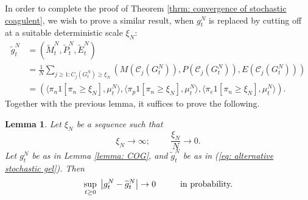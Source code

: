 \documentclass[11pt, notitlepage]{article}
\newtheorem{lem}[thm]{Lemma}
\begin{document}
  In order to complete the proof of Theorem \ref{thrm: convergence of stochastic coagulent}, we wish to prove a similar result, when $g^N_t$ is replaced by cutting off at a suitable deterministic scale $\xi_N$: \begin{equation}\label{eq: alternative stochastic gel} \begin{split} \widetilde{g}^N_t&=(\widetilde{M}^N_t,\widetilde{P}^N_t,\widetilde{E}^N_t)\\& =\frac{1}{N}\sum_{j\ge 1: C_j(G^N_t)\ge \xi_N}(M(\mathcal{C}_j(G^N_t)),P(\mathcal{C}_j(G^N_t)),E(\mathcal{C}_j(G^N_t))) \\[1ex] & = \left(\langle \pi_n1[\pi_n\ge \xi_N], \mu^N_t\rangle,\langle \pi_p1[\pi_n\ge \xi_N], \mu^N_t\rangle,\langle \pi_e1[\pi_n\ge \xi_N], \mu^N_t\rangle\right). \end{split} \end{equation} 
   Together with the previous lemma, it suffices to prove the following. \begin{lem} Let $\xi_N$ be a sequence such that \begin{equation} \xi_N\rightarrow \infty; \hspace{1cm} \frac{\xi_N}{N}\rightarrow 0. \end{equation} Let $g^N_t$ be as in Lemma \ref{lemma: COG}, and $\widetilde{g}^N_t$ be as in (\ref{eq: alternative stochastic gel}). Then \begin{equation}
       \sup_{t\ge 0}\hspace{0.1cm} \left|g^N_t-\widetilde{g}^N_t\right|\rightarrow 0\hspace{1cm}\text{in probability.}
   \end{equation} \end{lem} 
\end{document}
